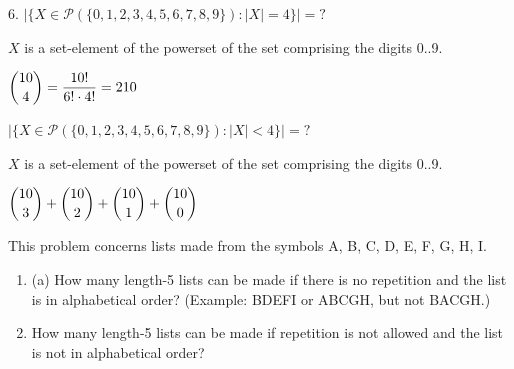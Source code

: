 \documentclass[openany, 12pt]{book}
\begin{document}
\begin{exercise}{}{}
	6. $|\{X \in \mathcal{P}(\{0,1,2,3,4,5,6,7,8,9\}):|X|=4\}|=?$
	\begin{alist}
		\item $X$ is a set-element of the powerset of the set comprising the digits 0..9.
		\item $\dbinom{10}{4}= \dfrac{10!}{6!\cdot4!}=210$
	\end{alist}
\end{exercise}

\begin{exercise}{}{}
	$|\{X \in \mathcal{P}(\{0,1,2,3,4,5,6,7,8,9\}):|X|<4\}|=?$
	\begin{alist}
		\item $X$ is a set-element of the powerset of the set comprising the digits 0..9.
		\item $\dbinom{10}{3} + \dbinom{10}{2} + \dbinom{10}{1} + \dbinom{10}{0}$
	\end{alist}
\end{exercise}

\begin{exercise}{}{}
	This problem concerns lists made from the symbols A, B, C, D, E, F, G, H, I.

	\begin{enumerate}[label = {(\arabic*)}]
		\item (a) How many length-5 lists can be made if there is no repetition
		      and the list is in alphabetical order? (Example: BDEFI or ABCGH, but
		      not BACGH.)
		\item How many length-5 lists can be made if repetition is not allowed
		      and the list is not in alphabetical order?
	\end{enumerate}
\end{exercise}
\end{document}
